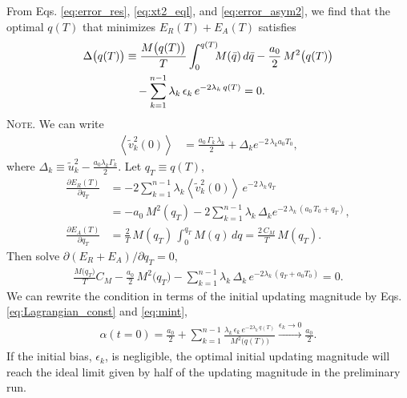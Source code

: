 \documentclass[preprint, superscriptaddress, floatfix]{revtex4-1}
\newcommand{\note}[1]{{\color{DarkGreen}\footnotesize \textsc{Note.} #1}}
\newcommand{\Err}{E}
\begin{document}
%
From Eqs. \eqref{eq:error_res},
\eqref{eq:xt2_eql},
and \eqref{eq:error_asym2},
we find that
the optimal $q(T)$ that minimizes $\Err_R(T) + \Err_A(T)$
satisfies
%
\begin{align}
  \Delta\bigl( q(T) \bigr)
  &\equiv
  \frac{ M\bigl( q(T) \bigr) } { T }
    \int_0^{q(T)} \!\!\! M(\bar q) \, d\bar q
  -\frac{a_0}{2} \, M^2\bigl( q(T) \bigr)
  \notag \\
  &\quad
  -\sum_{k = 1}^{n-1}
  \lambda_k \, \epsilon_k \, e^{-2\lambda_k \, q(T)}
  =0
  .
  \label{eq:opt_qT}
\end{align}
%
%
\note{We can write
\begin{align*}
  \left\langle
    {\tilde v}_k^2(0)
  \right\rangle
  &=
  \frac { a_0 \, \Gamma_k \, \lambda_k } { 2 }
  +
  \Delta_k
  e^{-2\, \lambda_k a_0 T_0}
  ,
\end{align*}
%
where $\Delta_k \equiv \tilde u_k^2 - \frac{a_0 \lambda_k \Gamma_k}{2}$.
%
Let $q_T \equiv q(T)$,
\begin{align*}
  \frac{
    \partial \Err_R(T)
  }
  {
    \partial q_T
  }
  &=
  -2\sum_{k=1}^{n-1} \lambda_k
  \left\langle
    \tilde v_k^2(0)
  \right\rangle \,
  e^{-2 \, \lambda_k \, q_T}
  \\
  &=
  -a_0 \, M^2(q_T)
  -2
  \sum_{k=1}^{n-1} \lambda_k \,
  \Delta_k e^{-2 \, \lambda_k \, (a_0 \, T_0 + q_T)}
  ,
  \\
  \frac{
    \partial \Err_A(T)
  }
  {
    \partial q_T
  }
  &=
  \frac 2 T \,
  M(q_T) \,
  \int_0^{ q_T } M(q) \, dq
  =
  \frac{ 2 \, C_M } { T } \, M(q_T)
  .
\end{align*}
Then solve $\partial (\Err_R + \Err_A) / \partial q_T = 0$,
\begin{align*}
  \frac{ M\bigl( q_T \bigr) } { T } C_M
  -\frac{a_0}{2} \, M^2\bigl( q_T \bigr)
  -\sum_{k = 1}^{n-1}
  \lambda_k \, \Delta_k \, e^{-2\lambda_k \, (q_T + a_0 T_0)}
  =0
  .
\end{align*}
}
%
We can rewrite the condition in terms of
the initial updating magnitude
by Eqs. \eqref{eq:Lagrangian_const} and \eqref{eq:mint}, %
\begin{align}
  \alpha(t = 0)
  =
  \frac{ a_0 } { 2 }
  +
  \sum_{k = 1}^{n-1}
  \frac{
    \lambda_k \, \epsilon_k \, e^{-2\lambda_k \, q(T)}
  }{
    M^2\bigl( q(T) \bigr)
  }
  \xrightarrow{\epsilon_k \to 0}
  \frac{ a_0 }
       { 2 }
  .
  \label{eq:half_alpha0}
\end{align}
%
%
If the initial bias, $\epsilon_k$, is negligible,
the optimal initial updating magnitude
will reach the ideal limit given by
half of the updating magnitude in the preliminary run.
\end{document}
